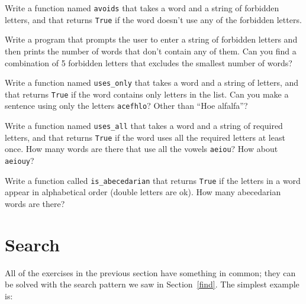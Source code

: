 \documentclass[10pt]{book}
\begin{document}
\begin{exercise} 

Write a function named {\tt avoids}
that takes a word and a string of forbidden letters, and
that returns {\tt True} if the word doesn't use any of the forbidden
letters.

Write a program that prompts the user to enter a string
of forbidden letters and then prints the number of words that
don't contain any of them.
Can you find a combination of 5 forbidden letters that
excludes the smallest number of words?

\end{exercise}



\begin{exercise}

Write a function named \verb"uses_only" that takes a word and a
string of letters, and that returns {\tt True} if the word contains
only letters in the list.  Can you make a sentence using only the
letters {\tt acefhlo}?  Other than ``Hoe alfalfa''?

\end{exercise}


\begin{exercise} 

Write a function named \verb"uses_all" that takes a word and a
string of required letters, and that returns {\tt True} if the word
uses all the required letters at least once.  How many words are there
that use all the vowels {\tt aeiou}?  How about {\tt aeiouy}?

\end{exercise}


\begin{exercise}

Write a function called \verb"is_abecedarian" that returns
{\tt True} if the letters in a word appear in alphabetical order
(double letters are ok).  
How many abecedarian words are there?


\end{exercise}



\section{Search}
\label{search}

All of the exercises in the previous section have something
in common; they can be solved with the search pattern we saw
in Section~\ref{find}.  The simplest example is:
\end{document}
